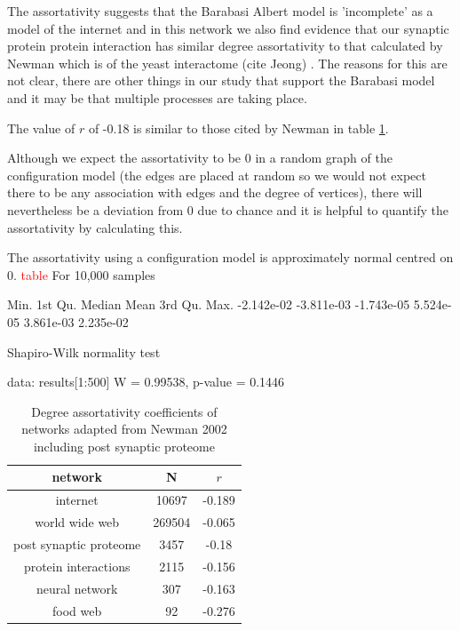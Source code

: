 The assortativity suggests that the Barabasi Albert model is 'incomplete' as a model of the internet \cite{newman2002assortative} and in this network we also find evidence that our synaptic protein protein interaction has similar degree assortativity to that calculated by Newman which is of the yeast interactome (cite Jeong) . The reasons for this are not clear, there are other things in our study that support the Barabasi model and it may be that multiple processes are taking place. 

The value of $r$ of -0.18  is similar to those cited by Newman \cite{newman2002assortative} in table \ref{Table:DegreeAssortativityNewman}. 

Although we expect the assortativity to be 0 in a random graph of the configuration model (the edges are placed at random so we would not expect there to be any association with edges and the degree of vertices), there will nevertheless be a deviation from 0 due to chance and it is helpful to quantify the assortativity by calculating this. 

The assortativity using a configuration model  is approximately normal centred on 0.
\textcolor{red}{table}
For 10,000 samples   

Min.    1st Qu.     Median       Mean    3rd Qu.       Max. 
-2.142e-02 -3.811e-03 -1.743e-05  5.524e-05  3.861e-03  2.235e-02 

Shapiro-Wilk normality test

data:  results[1:500]
W = 0.99538, p-value = 0.1446


\begin{table}[]
    \centering
    \begin{tabular}{c|c|c}
       network  &N& $r$  \\
       \hline
       internet & 10697&-0.189\\
       world wide web &269504 & -0.065\\
       post synaptic proteome & 3457 & -0.18\\
       protein interactions & 2115 & -0.156\\
       neural network & 307 & -0.163\\
       food web & 92 & -0.276 \\
       
       
         
    \end{tabular}
    \caption{Degree assortativity coefficients of networks adapted from Newman 2002 \cite{newman2002assortative} including post synaptic proteome}
    \label{Table:DegreeAssortativityNewman}
\end{table}

